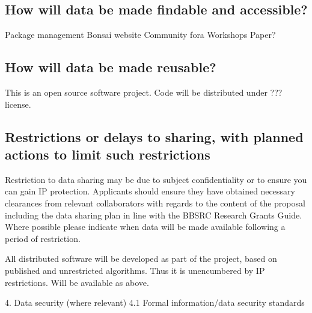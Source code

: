 \documentclass[a4paper,11pt]{article}
\begin{document}
\subsection{How will data be made findable and accessible?}

Package management
Bonsai website
Community fora
Workshops
Paper?



\subsection{How will data be made reusable?}

This is an open source software project.  Code will be distributed under ??? license.



\subsection{Restrictions or delays to sharing, with planned actions to limit such restrictions} 
Restriction to data sharing may be due to subject confidentiality or to ensure you can gain IP protection. Applicants should ensure they have obtained necessary clearances from relevant collaborators with regards to the content of the proposal including the data sharing plan in line with the BBSRC Research Grants Guide. Where possible please indicate when data will be made available following a period of restriction.  

All distributed software will be developed as part of the project, based on published and unrestricted algorithms.  Thus it is unencumbered by IP restrictions.  Will be available as above.

4. Data security (where relevant)
4.1	Formal information/data security standards
\end{document}
